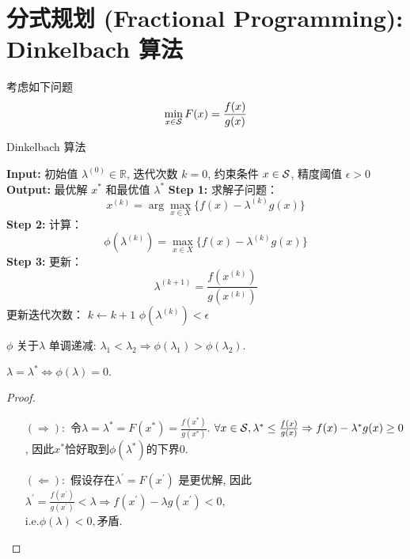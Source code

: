 	\section{分式规划 (Fractional Programming): Dinkelbach 算法}
	考虑如下问题
	\[
	\min_{x\in \S} F(x) = \frac{f(x)}{g(x)}
	\]	
	\begin{shaded}
		\begin{algorithm}[H]
			\caption{Dinkelbach 算法}
		\begin{algorithmic}[1]
			\State \textbf{Input:} 初始值 \( \lambda^{(0)} \in \mathbb{R} \), 迭代次数 \( k = 0 \), 约束条件 \( x \in \S \), 精度阈值 \( \epsilon > 0 \)
			\State \textbf{Output:} 最优解 \( x^* \) 和最优值 \( \lambda^* \)
			\Repeat
			\State \textbf{Step 1:} 求解子问题：
			\[
			x^{(k)} = \arg \max_{x \in X} \bigl\{ f(x) - \lambda^{(k)} g(x) \bigr\}
			\]
			\State \textbf{Step 2:} 计算：
			\[
			\phi(\lambda^{(k)}) = \max_{x \in X} \bigl\{ f(x) - \lambda^{(k)} g(x) \bigr\}
			\]
			\State \textbf{Step 3:} 更新：
			\[
			\lambda^{(k+1)} = \frac{f(x^{(k)})}{g(x^{(k)})}
			\]
			\State 更新迭代次数： \( k \gets k + 1 \)
			\Until \( \phi(\lambda^{(k)}) < \epsilon \)
		\end{algorithmic}	
		\end{algorithm}
	\end{shaded}
	\begin{property}
	  $\phi$ 关于$\lambda$ 单调递减: \(\lambda_1<\lambda_2\Rightarrow \phi(\lambda_1)>\phi(\lambda_2).\)
	\end{property}
	\begin{property}
		$\lambda = \lambda^*\Leftrightarrow \phi(\lambda)=0.$ 
	\begin{proof}
		\begin{itemize} 
			\item[$(\Rightarrow): $] 令$\lambda=\lambda^*=F(x^*)=\frac{f(x^*)}{g(x^*)}.$
			  $ \forall x \in \S, \lambda^*\leq \frac{f(x)}{g(x)}\Rightarrow f(x)-\lambda^*g(x)\geq 0$, 因此$x^*$恰好取到$\phi(\lambda^*)$的下界$0.$
			  \item[$(\Leftarrow):$] 假设存在$\lambda^\prime=F(x^\prime)$ 是更优解, 因此$\lambda^\prime=\frac{f(x^\prime)}{g(x^\prime)}<\lambda\Rightarrow f(x^\prime)-\lambda g(x^\prime)<0,$ \\$ \mathrm{i.e.} \phi(\lambda)<0, $矛盾.
		\end{itemize}
	\end{proof}
	\end{property}

